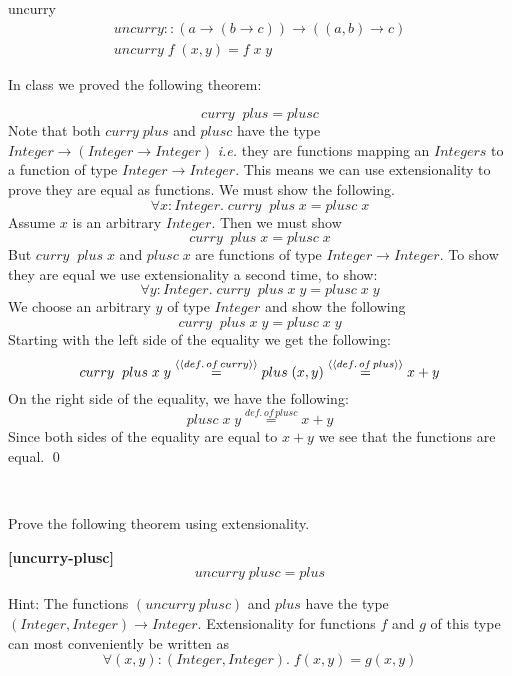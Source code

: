 \documentclass[11pt]{article}
\begin{document}
\begin{definition}{uncurry}
\[\begin{array}{l}
uncurry :: (a \rightarrow (b \rightarrow c)) \rightarrow ((a,b) \rightarrow c) \\
uncurry \;f\; (x,y) = f\; x\; y 
\end{array}\]
\end{definition}

In class we proved the following theorem:

\begin{theorem}{}
\[curry\;\; plus = plusc\]
\Proof Note that both $curry\;plus$ and $plusc$ have the type
$Integer\rightarrow (Integer \rightarrow Integer)$ {\em{i.e.}} they are
functions mapping an $Integers$ to a function of type
$Integer\rightarrow{}Integer$.  This means we can use extensionality to prove
they are equal as functions.  We must show the following.
\[\forall{}x:Integer.\; curry\;\; plus\; x = plusc\; x\]
Assume $x$ is an arbitrary $Integer$. Then we must show
\[curry\;\; plus\; x = plusc\; x\]
But $curry\;\; plus \; x$ and $plusc\; x$ are functions of type
$Integer\rightarrow{}Integer$. To show they are equal we use extensionality a
second time, to show:
\[\forall{}y:Integer.\; curry\;\; plus\; x\; y = plusc\; x\; y\]
We choose an arbitrary $y$ of type $Integer$ and  show the following
\[curry\;\; plus\; x\; y = plusc\; x\; y\]
Starting with the left side of the equality we get the following:
\[curry\;\; plus\; x\; y \stackrel{{\langle{{\langle{def.\,of\, curry}\rangle}}\rangle}}{=} plus\; (x,y)   \stackrel{{\langle{{\langle{def.\,of\, plus}\rangle}}\rangle}}{=} x + y \]
On the right side of the equality, we have the following:
\[plusc\; x\; y \stackrel{def.\,of\, plusc}{=} x + y \]
Since both sides of the equality are equal to $x+y$ we see that the functions
are equal.  \qed
\end{theorem}
\ \\


\begin{problem}
Prove the following theorem using extensionality.

\begin{theorem}{\bf{[uncurry-plusc]}} 
\[uncurry\;plusc = plus \]
\end{theorem}

Hint: The functions $(uncurry\;plusc)$ and $plus$ have the type
$(Integer,Integer)\rightarrow{}Integer$.  Extensionality for functions $f$ and
$g$ of this type can most conveniently  be written as
\[\forall{}(x,y):(Integer,Integer).\; f (x,y) = g (x,y)\]

\end{problem}
\newpage
\end{document}
